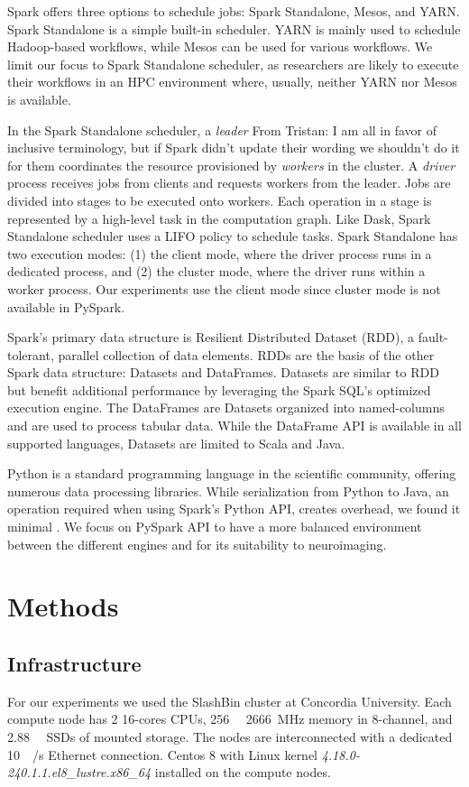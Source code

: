 \documentclass[conference]{IEEEtran}
\newcommand{\TG}[1]{\color{cyan}From Tristan: #1 \color{black}}
\begin{document}
Spark offers three options to schedule jobs: Spark Standalone, Mesos, and YARN.
Spark Standalone is a simple built-in scheduler.
YARN is mainly used to schedule Hadoop-based workflows, while Mesos can be used for various workflows.
We limit our focus to Spark Standalone scheduler, as researchers are likely to execute their workflows in an HPC environment where, usually, neither YARN nor Mesos is available.

In the Spark Standalone scheduler, a \textit{leader} \TG{I am all in favor of inclusive terminology, but if Spark didn't update their wording we shouldn't do it for them} coordinates the resource provisioned by \textit{workers} in the cluster.
A \textit{driver}  process receives jobs from clients and requests workers from the leader.
Jobs are divided into stages to be executed onto workers.
Each operation in a stage is represented by a high-level task in the computation graph.
Like Dask, Spark Standalone scheduler uses a LIFO policy to schedule tasks.
Spark Standalone has two execution modes: (1) the client mode, where the driver process runs in a dedicated process,
and (2) the cluster mode, where the driver runs within a worker process.
Our experiments use the client mode since cluster mode is not available in PySpark.

Spark's primary data structure is Resilient Distributed Dataset (RDD)\cite{RDD}, a fault-tolerant, parallel collection of data elements.
RDDs are the basis of the other Spark data structure: Datasets and DataFrames.
Datasets are similar to RDD but benefit additional performance by leveraging the Spark SQL's optimized execution engine. 
The DataFrames are Datasets organized into named-columns and are used to process tabular data. 
While the DataFrame API is available in all supported languages, Datasets are limited to Scala and Java. 

Python is a standard programming language in the scientific community, offering numerous data processing libraries.
While serialization from Python to Java, an operation required when using Spark's Python API, creates overhead, we found it minimal \cite{8943502}.
We focus on PySpark API to have a more balanced environment between the different engines and for its suitability to neuroimaging.

\section{Methods}
\subsection{Infrastructure}
For our experiments we used the SlashBin cluster at Concordia University.
Each compute node has 2 16-cores CPUs,
\SI{256}{\giga\byte} \SI{2666}{\mega\hertz} memory in 8-channel,
and \SI{2.88}{\tera\byte} SSDs of mounted storage.
The nodes are interconnected with a dedicated \SI{10}{\giga\bit/\second} Ethernet connection.
Centos 8 with Linux kernel \textit{4.18.0-240.1.1.el8\_lustre.x86\_64} installed on the compute nodes.
\end{document}
